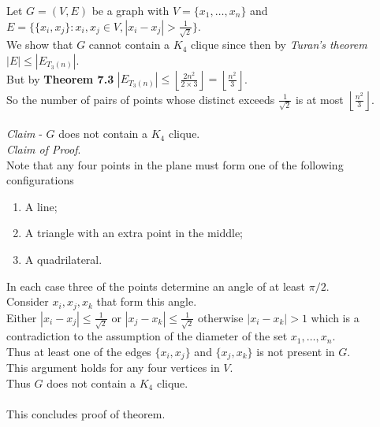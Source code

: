 \documentclass[11pt,a4paper]{article}
\begin{document}
Let $G=(V,E)$ be a graph with $V=\{x_1,\dots,x_n\}$ and $E=\{\{x_i,x_j\}:x_i,x_j\in V,|x_i-x_j|>\frac{1}{\sqrt{2}}\}$.\\
We show that $G$ cannot contain a $K_4$ clique since then by \textit{Turan's theorem} $|E|\leq|E_{T_3(n)}|$.\\
But by \textbf{Theorem 7.3} $|E_{T_3(n)}|\leq\left\lfloor\frac{2n^2}{2\times 3}\right\rfloor=\left\lfloor\frac{n^2}{3}\right\rfloor$.\\
So the number of pairs of points whose distinct exceeds $\frac{1}{\sqrt{2}}$ is at most $\left\lfloor\frac{n^2}{3}\right\rfloor$.\\
\\
\textit{Claim} - $G$ does not contain a $K_4$ clique.\\
\textit{Claim of Proof}.\\
Note that any four points in the plane must form one of the following configurations
\begin{enumerate}[label=\roman*)]
	\item A line;\\
	\item A triangle with an extra point in the middle;\\
	\item A quadrilateral.\\
\end{enumerate}
In each case three of the points determine an angle of at least $\pi/2$.\\
Consider $x_i,x_j,x_k$ that form this angle.\\
Either $|x_i-x_j|\leq\frac{1}{\sqrt{2}}$ or $|x_j-x_k|\leq\frac{1}{\sqrt{2}}$ otherwise $|x_i-x_k|>1$ which is a contradiction to the assumption of the diameter of the set $x_1,\dots,x_n$.\\
Thus at least one of the edges $\{x_i,x_j\}$ and $\{x_j,x_k\}$ is not present in $G$.\\
This argument holds for any four vertices in $V$.\\
Thus $G$ does not contain a $K_4$ clique.\\
\\
This concludes proof of theorem.\\
\end{document}

